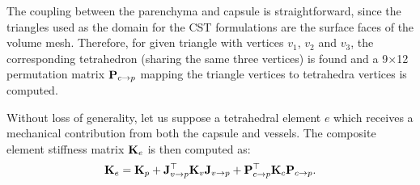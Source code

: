 The coupling between the parenchyma and capsule is straightforward, since the triangles used as the 
domain for the CST formulations are the surface faces of the volume mesh. Therefore, for given triangle 
with vertices $v_1$, $v_2$ and $v_3$, the corresponding tetrahedron (sharing the same three vertices) is found and 
a 9$\times$12 permutation matrix $\mathbf{P}_{c\rightarrow p}$ mapping the triangle vertices to tetrahedra vertices is computed. 

Without loss of generality, let us suppose a tetrahedral element $e$ 
which receives a mechanical contribution from both the capsule and vessels. The composite element stiffness matrix $\mathbf{K}_e$
is then computed as:
\begin{equation}
\mathbf{K}_e = \mathbf{K}_p + \mathbf{J}_{v\rightarrow p}^\top \mathbf{K}_v \mathbf{J}_{v\rightarrow p} + \mathbf{P}_{c\rightarrow p}^\top \mathbf{K}_c \mathbf{P}_{c\rightarrow p}.
\end{equation}


% 
% 

